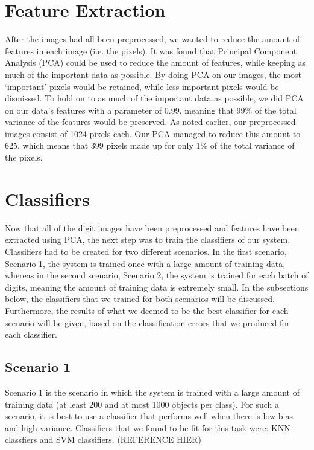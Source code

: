 \documentclass[11pt,twoside,a4paper]{article}
\begin{document}
\section{Feature Extraction}
After the images had all been preprocessed, we wanted to reduce the amount of features in each image (i.e. the pixels). It was found that Principal Component Analysis (PCA) could be used to reduce the amount of features, while keeping as much of the important data as possible. By doing PCA on our images, the most `important' pixels would be retained, while less important pixels would be dismissed.\newline\newline
To hold on to as much of the important data as possible, we did PCA on our data's features with a parameter of 0.99, meaning that 99\% of the total variance of the features would be preserved. As noted earlier, our preprocessed images consist of 1024 pixels each. Our PCA managed to reduce this amount to 625, which means that 399 pixels made up for only 1\% of the total variance of the pixels.


\section{Classifiers}
Now that all of the digit images have been preprocessed and features have been extracted using PCA, the next step was to train the classifiers of our system. Classifiers had to be created for two different scenarios. In the first scenario, Scenario 1, the system is trained once with a large amount of training data, whereas in the second scenario, Scenario 2, the system is trained for each batch of digits, meaning the amount of training data is extremely small.\newline\newline
In the subsections below, the classifiers that we trained for both scenarios will be discussed. Furthermore, the results of what we deemed to be the best classifier for each scenario will be given, based on the classification errors that we produced for each classifier.
\subsection{Scenario 1}
Scenario 1 is the scenario in which the system is trained with a large amount of training data (at least 200 and at most 1000 objects per class). For such a scenario, it is best to use a classifier that performs well when there is low bias and high variance. Classifiers that we found to be fit for this task were: KNN classfiers and SVM classifiers. (REFERENCE HIER)
%
\end{document}
